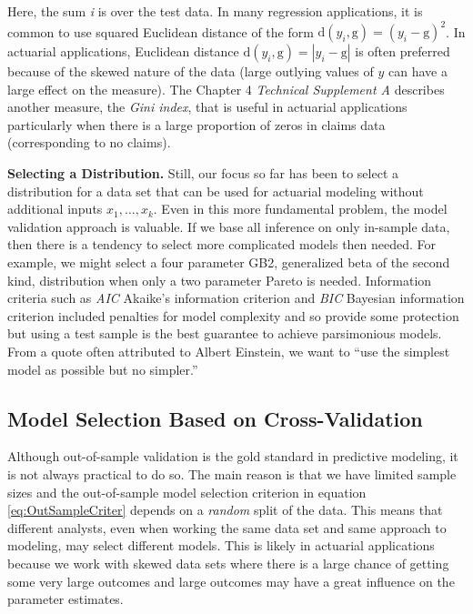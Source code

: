 \documentclass[]{book}
\theoremstyle{definition}
\theoremstyle{definition}
\theoremstyle{definition}
\theoremstyle{remark}
\begin{document}
Here, the sum \emph{i} is over the test data. In many regression
applications, it is common to use squared Euclidean distance of the form
\(\mathrm{d}(y_i,\mathrm{g}) = (y_i-\mathrm{g})^2\). In actuarial
applications, Euclidean distance
\(\mathrm{d}(y_i,\mathrm{g}) = |y_i-\mathrm{g}|\) is often preferred
because of the skewed nature of the data (large outlying values of \(y\)
can have a large effect on the measure). The Chapter 4 \emph{Technical
Supplement A} describes another measure, the \emph{Gini index}, that is
useful in actuarial applications particularly when there is a large
proportion of zeros in claims data (corresponding to no claims).

\textbf{Selecting a Distribution.} Still, our focus so far has been to
select a distribution for a data set that can be used for actuarial
modeling without additional inputs \(x_1, \ldots, x_k\). Even in this
more fundamental problem, the model validation approach is valuable. If
we base all inference on only in-sample data, then there is a tendency
to select more complicated models then needed. For example, we might
select a four parameter GB2, generalized beta of the second kind,
distribution when only a two parameter Pareto is needed. Information
criteria such as \emph{AIC}{ Akaike's information criterion} and
\emph{BIC}{ Bayesian information criterion} included penalties for model
complexity and so provide some protection but using a test sample is the
best guarantee to achieve parsimonious models. From a quote often
attributed to Albert Einstein, we want to ``use the simplest model as
possible but no simpler.''

\subsection{Model Selection Based on
Cross-Validation}\label{model-selection-based-on-cross-validation}

Although out-of-sample validation is the gold standard in predictive
modeling, it is not always practical to do so. The main reason is that
we have limited sample sizes and the out-of-sample model selection
criterion in equation \eqref{eq:OutSampleCriter} depends on a
\emph{random} split of the data. This means that different analysts,
even when working the same data set and same approach to modeling, may
select different models. This is likely in actuarial applications
because we work with skewed data sets where there is a large chance of
getting some very large outcomes and large outcomes may have a great
influence on the parameter estimates.
\end{document}
